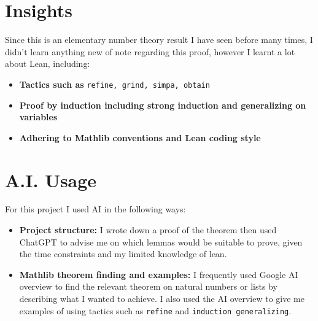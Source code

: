 \documentclass{article}
\begin{document}
\section{Insights}
Since this is an elementary number theory result I have seen before many times, I didn't learn 
anything new of note regarding this proof, however I learnt a lot about Lean, including:
\begin{itemize}
\item \textbf{Tactics such as} \verb|refine, grind, simpa, obtain|
\item \textbf{Proof by induction including strong induction and generalizing on variables}
\item \textbf{Adhering to Mathlib conventions and Lean coding style}
\end{itemize}

\section{A.I. Usage}
For this project I used AI in the following ways:
\begin{itemize}
\item \textbf{Project structure:}
I wrote down a proof of the theorem then used ChatGPT to advise me on which lemmas would be suitable to prove, given the time constraints and my limited knowledge of lean.

\item \textbf{Mathlib theorem finding and examples:} 
I frequently used Google AI overview to find the relevant theorem on natural numbers or lists by 
describing what I wanted to achieve. I also used the AI overview to give me examples of using 
tactics such as \verb|refine| and \verb|induction generalizing|.

\end{itemize}
\end{document}
